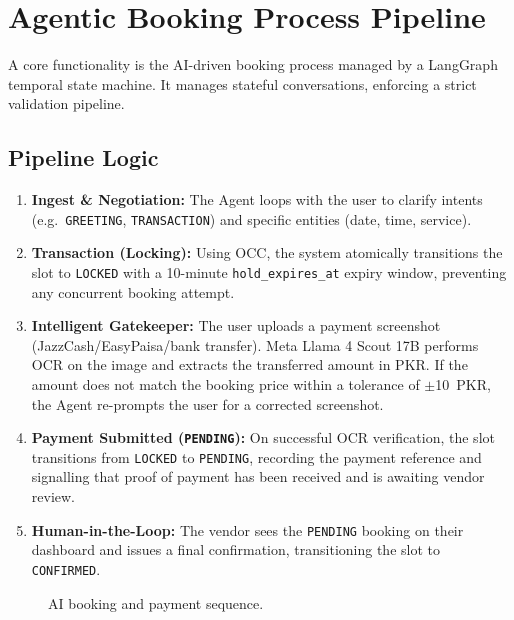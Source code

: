 \section{Agentic Booking Process Pipeline}
\label{sec:sds-agent-pipeline}

A core functionality is the AI-driven booking process managed by a LangGraph temporal state machine. It manages stateful conversations, enforcing a strict validation pipeline.

\subsection{Pipeline Logic}
\begin{enumerate}
    \item \textbf{Ingest \& Negotiation:} The Agent loops with the user to clarify intents (e.g.\ \texttt{GREETING}, \texttt{TRANSACTION}) and specific entities (date, time, service).
    \item \textbf{Transaction (Locking):} Using OCC, the system atomically transitions the slot to \texttt{LOCKED} with a 10-minute \texttt{hold\_expires\_at} expiry window, preventing any concurrent booking attempt.
    \item \textbf{Intelligent Gatekeeper:} The user uploads a payment screenshot (JazzCash/EasyPaisa/bank transfer). Meta Llama 4 Scout 17B performs OCR on the image and extracts the transferred amount in PKR. If the amount does not match the booking price within a tolerance of $\pm$10~PKR, the Agent re-prompts the user for a corrected screenshot.
    \item \textbf{Payment Submitted (\texttt{PENDING}):} On successful OCR verification, the slot transitions from \texttt{LOCKED} to \texttt{PENDING}, recording the payment reference and signalling that proof of payment has been received and is awaiting vendor review.
    \item \textbf{Human-in-the-Loop:} The vendor sees the \texttt{PENDING} booking on their dashboard and issues a final confirmation, transitioning the slot to \texttt{CONFIRMED}.
\end{enumerate}

\begin{figure}[H]
    \centering
    \caption{AI booking and payment sequence.}
    \label{fig:sds-seq-dig}
\end{figure}

